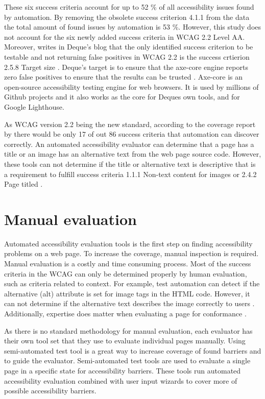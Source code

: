 These six success criteria account for up to 52 \% of all accessibility issues found by automation. By removing the obsolete success criterion 4.1.1 from the data the total amount of found issues by automation is 53 \%. However, this study does not account for the six newly added success criteria in WCAG 2.2 Level AA. Moreover, \textcite{dequeaxe4_5} writes in Deque's blog that the only identified success criterion to be testable and not returning false positives in WCAG 2.2 is the success crtierion 2.5.8 Target size \citep{dequeaxe4_5}. Deque's target is to ensure that the axe-core engine reports zero false positives to ensure that the results can be trusted \citep{dequecoverage}. Axe-core is an open-source accessibility testing engine for web browsers. It is used by millions of Github projects and it also works as the core for Deques own tools, and for Google Lighthouse. 

As WCAG version 2.2 being the new standard, according to the coverage report by \textcite{dequecoverage} there would be only 17 of out 86 success criteria that automation can discover correctly. An automated accessibility evaluator can determine that a page has a title or an image has an alternative text from the web page source code. However, these tools can not determine if the title or alternative text is descriptive that is a requirement to fulfill success criteria 1.1.1 Non-text content for images or 2.4.2 Page titled \citep{wcag_checklist}.

\section{Manual evaluation}

Automated accessibility evaluation tools is the first step on finding accessibility problems on a web page. To increase the coverage, manual inspection is required. Manual evaluation is a costly and time consuming process. Most of the success criteria in the WCAG can only be determined properly by human evaluation, such as criteria related to context. For example, test automation can detect if the alternative (alt) attribute is set for image tags in the HTML code. However, it can not determine if the alternative text describes the image correctly to users \citep{comparison_10.1145/3371300.3383346}. Additionally, expertise does matter when evaluating a page for conformance \citep{10.1145/1878803.1878813_testability_expertise, comparative_accessibility_methods}.

As there is no standard methodology for manual evaluation, each evaluator has their own tool set that they use to evaluate individual pages manually. Using semi-automated test tool is a great way to increase coverage of found barriers and to guide the evaluator. Semi-automated test tools are used to evaluate a single page in a specific state for accessibility barriers. These tools run automated accessibility evaluation combined with user input wizards to cover more of possible accessibility barriers. 

